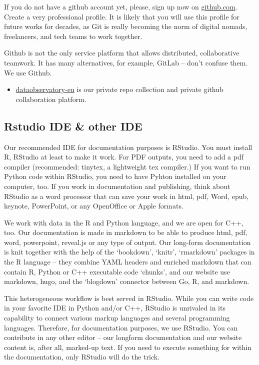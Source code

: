 \documentclass[
  fontsize=13pt,
  english,
  a4paper,
  openany, a4paper, oneside]{book}
\providecommand{\tightlist}{%
  \setlength{\itemsep}{0pt}\setlength{\parskip}{0pt}}
\begin{document}
If you do not have a github account yet, please, sign up now on \href{https://github.com/}{github.com}. Create a very professional profile. It is likely that you will use this profile for future works for decades, as Git is really becoming the norm of digital nomads, freelancers, and tech teams to work together.

Github is not the only service platform that allows distributed, collaborative teamwork. It has many alternatives, for example, GitLab -- don't confuse them. We use Github.

\begin{itemize}
\tightlist
\item
  \href{https://github.com/dataobservatory-eu}{dataobservatory-eu} is our private repo collection and private github collaboration platform.
\end{itemize}

\hypertarget{rstudio-ide-other-ide}{%
\subsection{Rstudio IDE \& other IDE}\label{rstudio-ide-other-ide}}

Our recommended IDE for documentation purposes is RStudio. You must install R, RStudio at least to make it work. For PDF outputs, you need to add a pdf compiler (recommended: tinytex, a lightweight tex compiler.) If you want to run Python code within RStudio, you need to have Pyhton installed on your computer, too. If you work in documentation and publishing, think about RStudio as a word processor that can save your work in html, pdf, Word, epub, keynote, PowerPoint, or any OpenOffice or Apple formats.

We work with data in the R and Python language, and we are open for C++, too. Our documentation is made in markdown to be able to produce html, pdf, word, powerpoint, reveal.js or any type of output. Our long-form documentation is knit together with the help of the `bookdown', `knitr', `rmarkdown' packages in the R language -- they combine YAML headers and enriched markdown that can contain R, Python or C++ executable code `chunks', and our website use markdown, hugo, and the `blogdown' connector between Go, R, and markdown.

This heterogeneous workflow is best served in RStudio. While you can write code in your favorite IDE in Python and/or C++, RStudio is unrivaled in its capability to connect various markup languages and several programming languages. Therefore, for documentation purposes, we use RStudio. You can contribute in any other editor -- our longform documentation and our website content is, after all, marked-up text. If you need to execute something for within the documentation, only RStudio will do the trick.
\end{document}
